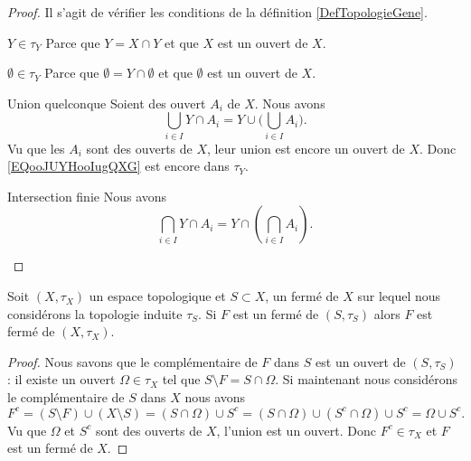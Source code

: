 \begin{proof}
    Il s'agit de vérifier les conditions de la définition \ref{DefTopologieGene}.

    \begin{subproof}
    \item[\( Y\in \tau_Y\)]
        Parce que \( Y=X\cap Y\) et que \( X\) est un ouvert de \( X\).
    \item[\( \emptyset\in \tau_Y\)]
        Parce que \( \emptyset = Y\cap\emptyset\) et que \( \emptyset\) est un ouvert de \( X\).
    \item[Union quelconque]
        Soient des ouvert \( A_i\) de \( X\). Nous avons
        \begin{equation}        \label{EQooJUYHooIugQXG}
            \bigcup_{i\in I}Y\cap A_i=Y\cup\big( \bigcup_{i\in I}A_i \big).
        \end{equation}
        Vu que les \( A_i\) sont des ouverts de \( X\), leur union est encore un ouvert de \( X\). Donc \eqref{EQooJUYHooIugQXG} est encore dans \( \tau_Y\).
    \item[Intersection finie]
        Nous avons
        \begin{equation}
            \bigcap_{i\in I}Y\cap A_i=Y\cap\left( \bigcap_{i\in I}A_i \right).
        \end{equation}
    \end{subproof}
\end{proof}


\begin{lemma}        \label{LemBWSUooCCGvax}
    Soit \( (X,\tau_X)\) un espace topologique et \( S\subset X\), un fermé de \( X\) sur lequel nous considérons la topologie induite \( \tau_S\). Si \( F\) est un fermé de \( (S,\tau_S)\) alors \( F\) est fermé de \( (X,\tau_X)\).
\end{lemma}

\begin{proof}
    Nous savons que le complémentaire de \( F\) dans \( S\) est un ouvert de \( (S,\tau_S)\) : il existe un ouvert \( \Omega\in \tau_X\) tel que \( S\setminus F=S\cap \Omega\). Si maintenant nous considérons le complémentaire de \( S\) dans \( X\) nous avons
    \begin{equation}
        F^c=(S\setminus F)\cup (X\setminus S)=(S\cap \Omega)\cup S^c=(S\cap \Omega)\cup(S^c\cap \Omega)\cup S^c=\Omega\cup S^c.
    \end{equation}
    Vu que \( \Omega\) et \( S^c\) sont des ouverts de \( X\), l'union est un ouvert. Donc \( F^c\in \tau_X\) et \( F\) est un fermé de \( X\).
\end{proof}

